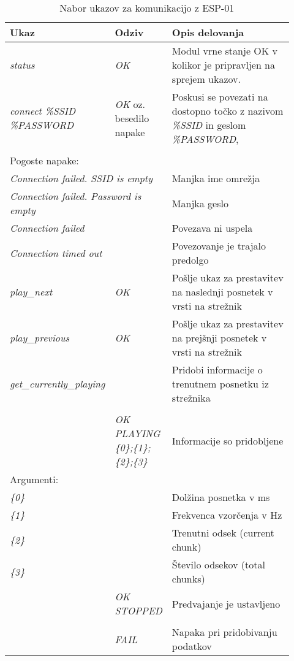 \documentclass[12pt,a4paper,twoside,openright,slovene]{book}
\begin{document}
\begin{footnotesize}
	\begin{center}
		\begin{longtable}{p{0.22\linewidth}|p{0.2\linewidth}|p{0.5\linewidth}}
			\caption{Nabor ukazov za komunikacijo z ESP-01}
			\label{instruction_set_ESP_01} \\
			Ukaz & Odziv & Opis delovanja \\ \hline \hline
			\textit{status} & \textit{OK} & Modul vrne stanje OK v kolikor je pripravljen na sprejem ukazov. \\ \hline
			\textit{connect \%SSID \%PASSWORD} & \textit{OK} oz. besedilo napake & Poskusi se povezati na dostopno točko z nazivom \textit{\%SSID} in geslom \textit{\%PASSWORD},\\ \\
			\multicolumn{3}{l}{\quad Pogoste napake:} \\
			\multicolumn{2}{l|}{\quad\quad \textit{Connection failed. SSID is empty}} & Manjka ime omrežja \\
			\multicolumn{2}{l|}{\quad\quad \textit{Connection failed. Password is empty}} & Manjka geslo \\
			\multicolumn{2}{l|}{\quad\quad \textit{Connection failed}} & Povezava ni uspela \\
			\multicolumn{2}{l|}{\quad\quad \textit{Connection timed out}} & Povezovanje je trajalo predolgo \\ \hline
			\textit{play\_next} & \textit{OK} & Pošlje ukaz za prestavitev na naslednji posnetek v vrsti na strežnik \\ \hline
			\textit{play\_previous} & \textit{OK} & Pošlje ukaz za prestavitev na prejšnji posnetek v vrsti na strežnik \\ \hline
			\textit{get\_currently\_playing} &  & Pridobi informacije o trenutnem posnetku iz strežnika \\ \\
			& \textit{OK PLAYING \{0\};\{1\};\{2\};\{3\}} & Informacije so pridobljene \\
			\multicolumn{3}{l}{\quad Argumenti:} \\
			\multicolumn{2}{l|}{\quad\quad \textit{\{0\}}} & Dolžina posnetka v ms \\
			\multicolumn{2}{l|}{\quad\quad \textit{\{1\}}} & Frekvenca vzorčenja v Hz \\
			\multicolumn{2}{l|}{\quad\quad \textit{\{2\}}} & Trenutni odsek (current chunk) \\
			\multicolumn{2}{l|}{\quad\quad \textit{\{3\}}} & Število odsekov (total chunks) \\ \
			& \textit{OK STOPPED} & Predvajanje je ustavljeno \\ \\
			& \textit{FAIL} & Napaka pri pridobivanju podatkov \\ \hline
			

\end{longtable}
\end{center}
\end{footnotesize}
\end{document}
